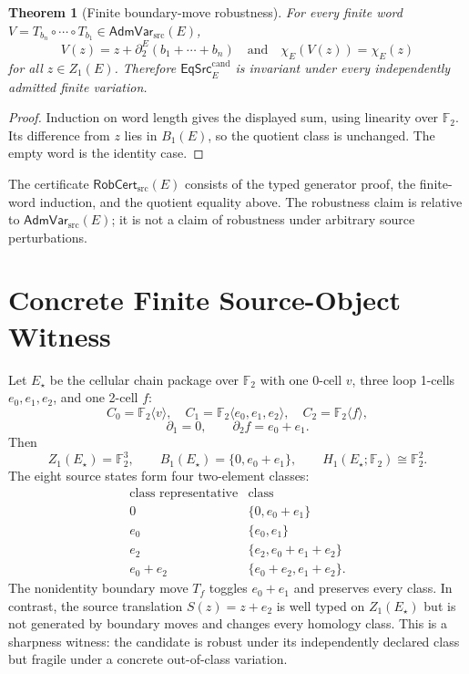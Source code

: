 \documentclass[11pt]{article}
\newtheorem{theorem}{Theorem}
\newcommand{\Ftwo}{\mathbb F_2}
\newcommand{\AdmVar}{\mathsf{AdmVar}_{\mathrm{src}}}
\newcommand{\RobCert}{\mathsf{RobCert}_{\mathrm{src}}}
\newcommand{\EqCand}{\mathsf{EqSrc}^{\mathrm{cand}}}
\begin{document}
\begin{theorem}[Finite boundary-move robustness]
For every finite word
\(V=T_{b_n}\circ\cdots\circ T_{b_1}\in\AdmVar(E)\),
\[
 V(z)=z+\partial_2^E(b_1+\cdots+b_n)
 \quad\text{and}\quad
 \chi_E(V(z))=\chi_E(z)
\]
for all \(z\in Z_1(E)\). Therefore \(\EqCand_E\) is invariant under every
independently admitted finite variation.
\end{theorem}

\begin{proof}
Induction on word length gives the displayed sum, using linearity over
\(\Ftwo\). Its difference from \(z\) lies in \(B_1(E)\), so the quotient
class is unchanged. The empty word is the identity case.
\end{proof}

The certificate \(\RobCert(E)\) consists of the typed generator proof, the
finite-word induction, and the quotient equality above. The robustness claim
is relative to \(\AdmVar(E)\); it is not a claim of robustness under arbitrary
source perturbations.

\section{Concrete Finite Source-Object Witness}

Let \(E_\star\) be the cellular chain package over \(\Ftwo\) with one
0-cell \(v\), three loop 1-cells \(e_0,e_1,e_2\), and one 2-cell \(f\):
\[
 C_0=\Ftwo\langle v\rangle,\quad
 C_1=\Ftwo\langle e_0,e_1,e_2\rangle,\quad
 C_2=\Ftwo\langle f\rangle,
\]
\[
 \partial_1=0,\qquad \partial_2f=e_0+e_1.
\]
Then
\[
 Z_1(E_\star)=\Ftwo^3,\qquad
 B_1(E_\star)=\{0,e_0+e_1\},\qquad
 H_1(E_\star;\Ftwo)\cong\Ftwo^2.
\]
The eight source states form four two-element classes:
\[
\begin{array}{c|c}
\text{class representative}&\text{class}\\\hline
0&\{0,e_0+e_1\}\\
e_0&\{e_0,e_1\}\\
e_2&\{e_2,e_0+e_1+e_2\}\\
e_0+e_2&\{e_0+e_2,e_1+e_2\}.
\end{array}
\]
The nonidentity boundary move \(T_f\) toggles \(e_0+e_1\) and preserves
every class. In contrast, the source translation \(S(z)=z+e_2\) is well
typed on \(Z_1(E_\star)\) but is not generated by boundary moves and changes
every homology class. This is a sharpness witness: the candidate is robust
under its independently declared class but fragile under a concrete
out-of-class variation.
\end{document}
